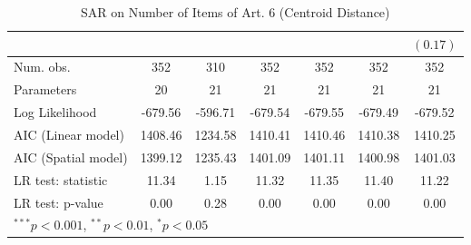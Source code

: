 \begin{table}[!h]
\begin{center}
\begin{tabular}{l c c c c c c }
                        &               &               &               &               &               & $(0.17)$      \\
\midrule
Num. obs.               & 352           & 310           & 352           & 352           & 352           & 352           \\
Parameters              & 20            & 21            & 21            & 21            & 21            & 21            \\
Log Likelihood          & -679.56       & -596.71       & -679.54       & -679.55       & -679.49       & -679.52       \\
AIC (Linear model)      & 1408.46       & 1234.58       & 1410.41       & 1410.46       & 1410.38       & 1410.25       \\
AIC (Spatial model)     & 1399.12       & 1235.43       & 1401.09       & 1401.11       & 1400.98       & 1401.03       \\
LR test: statistic      & 11.34         & 1.15          & 11.32         & 11.35         & 11.40         & 11.22         \\
LR test: p-value        & 0.00          & 0.28          & 0.00          & 0.00          & 0.00          & 0.00          \\
\bottomrule
\multicolumn{7}{l}{\scriptsize{$^{***}p<0.001$, $^{**}p<0.01$, $^*p<0.05$}}
\end{tabular}
\caption{SAR on Number of Items of Art. 6 (Centroid Distance)}
\label{table:coefficients}
\end{center}
\end{table}

